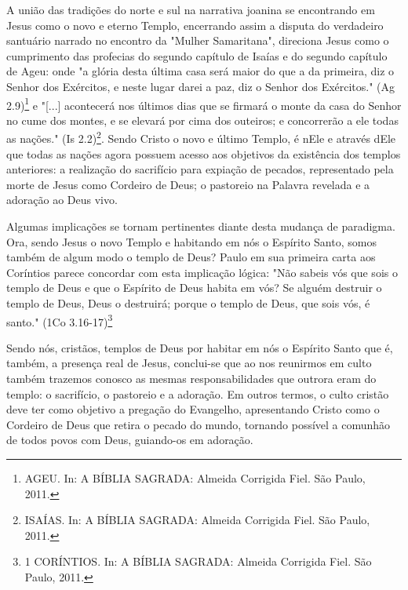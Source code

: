 \documentclass[
    article,            %
	12pt,				%
	oneside,			%
	a4paper,			%
	chapter=TITLE,		%
	section=TITLE,		%
	english,			%
	french,				%
	spanish,			%
	brazil				%
	]{abntex2}
\begin{document}
A união das tradições do norte e sul na narrativa joanina se encontrando em Jesus como o novo e eterno Templo, encerrando assim a disputa do verdadeiro santuário narrado no encontro da "Mulher Samaritana", direciona Jesus como o cumprimento das profecias do segundo capítulo de Isaías e do segundo capítulo de Ageu: onde "a glória desta última casa será maior do que a da primeira, diz o Senhor dos Exércitos, e neste lugar darei a paz, diz o Senhor dos Exércitos." (Ag 2.9)\footnote{AGEU. In: A BÍBLIA SAGRADA: Almeida Corrigida Fiel. São Paulo, 2011.} e "[...] acontecerá nos últimos dias que se firmará o monte da casa do Senhor no cume dos montes, e se elevará por cima dos outeiros; e concorrerão a ele todas as nações." (Is 2.2)\footnote{ISAÍAS. In: A BÍBLIA SAGRADA: Almeida Corrigida Fiel. São Paulo, 2011.}. Sendo Cristo o novo e último Templo, é nEle e através dEle que todas as nações agora possuem acesso aos objetivos da existência dos templos anteriores: a realização do sacrifício para expiação de pecados, representado pela morte de Jesus como Cordeiro de Deus; o pastoreio na Palavra revelada e a adoração ao Deus vivo.

Algumas implicações se tornam pertinentes diante desta mudança de paradigma. Ora, sendo Jesus o novo Templo e habitando em nós o Espírito Santo, somos também de algum modo o templo de Deus? Paulo em sua primeira carta aos Coríntios parece concordar com esta implicação lógica: "Não sabeis vós que sois o templo de Deus e que o Espírito de Deus habita em vós? Se alguém destruir o templo de Deus, Deus o destruirá; porque o templo de Deus, que sois vós, é santo." (1Co 3.16-17)\footnote{1 CORÍNTIOS. In: A BÍBLIA SAGRADA: Almeida Corrigida Fiel. São Paulo, 2011.}

Sendo nós, cristãos, templos de Deus por habitar em nós o Espírito Santo que é, também, a presença real de Jesus, conclui-se que ao nos reunirmos em culto também trazemos conosco as mesmas responsabilidades que outrora eram do templo: o sacrifício, o pastoreio e a adoração. Em outros termos, o culto cristão deve ter como objetivo a pregação do Evangelho, apresentando Cristo como o Cordeiro de Deus que retira o pecado do mundo, tornando possível a comunhão de todos povos com Deus, guiando-os em adoração.




\pagebreak
% 
\end{document}
